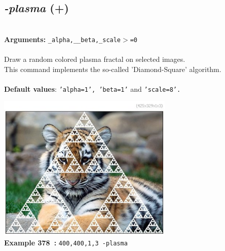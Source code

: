 \documentclass[a4paper,11pt,twoside]{book}
\begin{document}
\subsection{\emph{-plasma} (+)}\vspace*{-0.5em}
~\\\textbf{Arguments: } 
{\small \texttt{\_alpha,\_\_beta,\_scale$>$=0}}\\~\\
Draw a random colored plasma fractal on selected images.
~\\This command implements the so-called 'Diamond-Square' algorithm.
~\\~\\\textbf{Default values}: {\small \texttt{'alpha=1', 'beta=1'} and \texttt{'scale=8'.}}
\begin{center}\includegraphics[keepaspectratio=true,height=7cm,width=\textwidth]{img/gmic_def378.jpg}\\
{\footnotesize \textbf{Example 378~:} \texttt{400,400,1,3 -plasma}}
\end{center}
\end{document}
